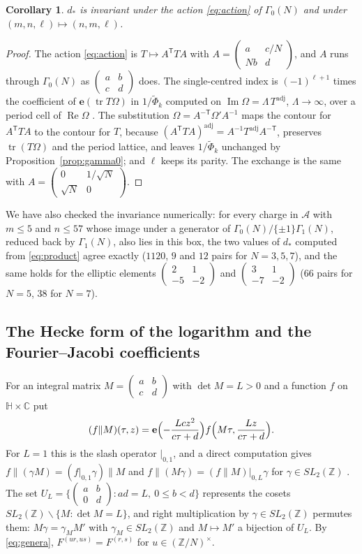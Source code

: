 \documentclass[11pt]{amsart}
\numberwithin{equation}{section}
\theoremstyle{plain}
\newtheorem{cor}[thm]{Corollary}
\theoremstyle{definition}
\theoremstyle{remark}
\newcommand{\Z}{\mathbb{Z}}
\newcommand{\C}{\mathbb{C}}
\newcommand{\cA}{\mathcal{A}}
\newcommand{\e}{\mathbf{e}}
\newcommand{\tPhi}{\widetilde{\Phi}}
\newcommand{\sm}[4]{\left(\begin{smallmatrix}#1&#2\\#3&#4\end{smallmatrix}\right)}
\begin{document}
\begin{cor}\label{cor:dstar}
$d_*$ is invariant under the action \eqref{eq:action} of $\Gamma_0(N)$ and under $(m,n,\ell)\mapsto(n,m,\ell)$.
\end{cor}

\begin{proof}
The action \eqref{eq:action} is $T\mapsto A^{\mathsf T}TA$ with $A=\sm a{c/N}{Nb}d$, and $A$ runs through $\Gamma_0(N)$ as $\sm abcd$ does. The single-centred index is $(-1)^{\ell+1}$ times the coefficient of $\e(\operatorname{tr}T\Omega)$ in $1/\tPhi_k$ computed on $\operatorname{Im}\Omega=\Lambda\,T^{\mathrm{adj}}$, $\Lambda\to\infty$, over a period cell of $\operatorname{Re}\Omega$ \cite{Sen11,Sen08}. The substitution $\Omega=A^{-\mathsf T}\Omega'A^{-1}$ maps the contour for $A^{\mathsf T}TA$ to the contour for $T$, because $(A^{\mathsf T}TA)^{\mathrm{adj}}=A^{-1}T^{\mathrm{adj}}A^{-\mathsf T}$, preserves $\operatorname{tr}(T\Omega)$ and the period lattice, and leaves $1/\tPhi_k$ unchanged by Proposition~\ref{prop:gamma0}; and $\ell$ keeps its parity. The exchange is the same with $A=\sm0{1/\sqrt N}{\sqrt N}0$.
\end{proof}

We have also checked the invariance numerically: for every charge in $\cA$ with $m\le5$ and $n\le57$ whose image under a generator of $\Gamma_0(N)/\{\pm1\}\Gamma_1(N)$, reduced back by $\Gamma_1(N)$, also lies in this box, the two values of $d_*$ computed from \eqref{eq:product} agree exactly ($1120$, $9$ and $12$ pairs for $N=3,5,7$), and the same holds for the elliptic elements $\sm21{-5}{-2}$ and $\sm31{-7}{-2}$ ($66$ pairs for $N=5$, $38$ for $N=7$).

\subsection{The Hecke form of the logarithm and the Fourier--Jacobi coefficients}\label{app:FJ}
For an integral matrix $M=\sm abcd$ with $\det M=L>0$ and a function $f$ on $\mathbb H\times\C$ put
\[
(f\|M)(\tau,z)=\e\Bigl(-\frac{Lcz^2}{c\tau+d}\Bigr)f\Bigl(M\tau,\frac{Lz}{c\tau+d}\Bigr).
\]
For $L=1$ this is the slash operator $|_{0,1}$, and a direct computation gives $f\|(\gamma M)=(f|_{0,1}\gamma)\|M$ and $f\|(M\gamma)=(f\|M)|_{0,L}\gamma$ for $\gamma\in SL_2(\Z)$ \cite[\S1]{EZ85}. The set $U_L=\{\sm ab0d:ad=L,\ 0\le b<d\}$ represents the cosets $SL_2(\Z)\backslash\{M:\det M=L\}$, and right multiplication by $\gamma\in SL_2(\Z)$ permutes them: $M\gamma=\gamma_MM'$ with $\gamma_M\in SL_2(\Z)$ and $M\mapsto M'$ a bijection of $U_L$. By \eqref{eq:genera}, $F^{(ur,us)}=F^{(r,s)}$ for $u\in(\Z/N)^\times$.
\end{document}
